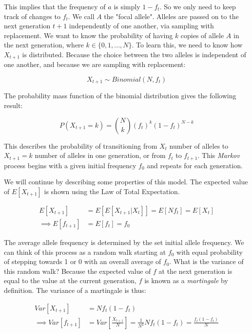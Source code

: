 This implies that the frequency of $a$ is simply $1-f_t$. So we only need to keep track of changes to $f_t$. We call $A$ the "focal allele". Alleles are passed on to the next generation $t+1$ independently of one another, via sampling with replacement. We want to know the probability of having $k$ copies of allele $A$ in the next generation, where $k \in \{0,1,...,N\}$. To learn this, we need to know how $X_{t+1}$ is distributed. Because the choice between the two alleles is independent of one another, and because we are sampling with replacement:

\begin{equation}
    X_{t+1} \sim Binomial(N,f_t)
\end{equation}

 The probability mass function of the binomial distribution gives the following result:

\begin{equation}
    P(X_{t+1} = k) = {N \choose k}(f_t)^k (1-f_t)^{N-k}
\end{equation}

This describes the probability of transitioning from $X_t$ number of alleles to $X_{t+1} = k$ number of alleles in one generation, or from $f_t$ to $f_{t+1}$. This \textit{Markov} process begins with a given initial frequency $f_0$ and repeats for each generation. 


We will continue by describing some properties of this model. The expected value of $E[X_{t+1}]$ is shown using the Law of Total Expectation.

\begin{equation} \label{eq:ex_drift}
    \begin{split}
            E[X_{t+1}] &= E[E[X_{t+1}|X_{t}]] = E[N f_t] = E[X_t] \\
    \implies E[f_{t+1}] &= E[f_t] = f_0
    \end{split}
\end{equation}


The average allele frequency is determined by the set initial allele frequency. We can think of this process as a random walk starting at $f_0$ with equal probability of stepping towards 1 or 0 with an overall average of $f_0$. What is the variance of this random walk? Because the expected value of $f$ at the next generation is equal to the value at the current generation, $f$ is known as a \textit{martingale} by definition. The variance of a martingale is thus:
 
\begin{equation}
    \begin{split}
            Var[X_{t+1}] &= N f_t(1-f_t) \\
            \implies Var[f_{t+1}] &= Var[\frac{X_{t+1}}{N}] =  \frac{1}{N^2} N f_t(1-f_t) = \frac{f_t (1-f_t)}{N} 
    \end{split}
\end{equation}

